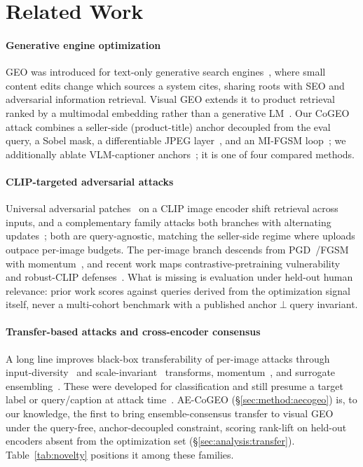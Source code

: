 \section{Related Work}
\label{sec:related}

\paragraph{Generative engine optimization} GEO was introduced for text-only generative search engines~\cite{aggarwal2023geo}, where small content edits change which sources a system cites, sharing roots with SEO and adversarial information retrieval. Visual GEO extends it to product retrieval ranked by a multimodal embedding rather than a generative LM~\cite{radford2021clip,jia2021scaling}. Our CoGEO attack combines a seller-side (product-title) anchor decoupled from the eval query, a Sobel mask, a differentiable JPEG layer~\cite{shin2017diffjpeg}, and an MI-FGSM loop~\cite{dong2018mifgsm}; we additionally ablate VLM-captioner anchors~\cite{li2022blip,wang2024qwen2vl}; it is one of four compared methods.

\paragraph{CLIP-targeted adversarial attacks} Universal adversarial patches~\cite{zhou2023advclip,moosavidezfooli2017uap} on a CLIP image encoder shift retrieval across inputs, and a complementary family attacks both branches with alternating updates~\cite{zhang2022coattack}; both are query-agnostic, matching the seller-side regime where uploads outpace per-image budgets. The per-image branch descends from PGD~\cite{madry2018pgd}/FGSM~\cite{goodfellow2015fgsm} with momentum~\cite{dong2018mifgsm}, and recent work maps contrastive-pretraining vulnerability~\cite{ilyas2019features,carlini2017cw} and robust-CLIP defenses~\cite{schlarmann2024robustclip}. What is missing is evaluation under held-out human relevance: prior work scores against queries derived from the optimization signal itself, never a multi-cohort benchmark with a published anchor$\perp$query invariant.

\paragraph{Transfer-based attacks and cross-encoder consensus} A long line improves black-box transferability of per-image attacks through input-diversity~\cite{xie2019dim} and scale-invariant~\cite{lin2020sim} transforms, momentum~\cite{dong2018mifgsm}, and surrogate ensembling~\cite{papernot2017transferable}. These were developed for classification and still presume a target label or query/caption at attack time~\cite{zhang2022coattack}. AE-CoGEO (\S\ref{sec:method:aecogeo}) is, to our knowledge, the first to bring ensemble-consensus transfer to visual GEO under the query-free, anchor-decoupled constraint, scoring rank-lift on held-out encoders absent from the optimization set (\S\ref{sec:analysis:transfer}). Table~\ref{tab:novelty} positions it among these families.

